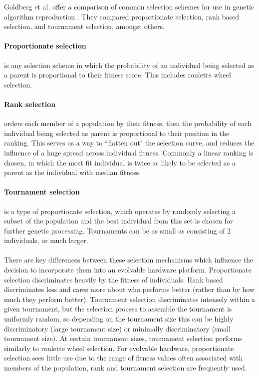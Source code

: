 Goldberg et al. offer a comparison of common selection schemes for use in genetic
algorithm reproduction \cite{GOLDBERG199169}. They compared proportionate
selection, rank based selection, and tournament selection, amongst others.

\paragraph{Proportionate selection} is any selection scheme in which the probability
of an individual being selected as a parent is proportional to their fitness score.
This includes roulette wheel selection.

\paragraph{Rank selection} orders each member of a population by their
fitness, then the probability of each individual being selected as
parent is proportional to their position in the ranking. This serves as
a way to ``flatten out" the selection curve, and reduces the influence of
a huge spread across individual fitness. Commonly a linear ranking is chosen,
in which the most fit individual is twice as likely to be selected
as a parent as the individual with median fitness.

\paragraph{Tournament selection} is a type of proportionate selection,
which operates by randomly selecting a subset of the
population and the best individual from this set is chosen for further genetic
processing. Tournaments can be as small as consisting of 2 individuals, or much
larger.

\paragraph{}
There are key differences between these selection mechanisms which influence
the decision to incorporate them into an evolvable hardware platform. Proportionate
selection discriminates heavily by the fitness of individuals. Rank based
discriminates less and cares more about who performs better (rather than by how
much they perform better). Tournament selection discriminates intensely within a given
tournament, but the selection process to assemble the tournament is uniformly
random, so depending on the tournament size this can be highly discriminatory
(large tournament size) or minimally discriminatory (small tournament size).
At certain tournament sizes, tournament selection performs similarly to roulette
wheel selection.
For evolvable hardware, proportionate selection sees little use due to the range
of fitness values often associated with members of the population, rank and
tournament selection are frequently used.


